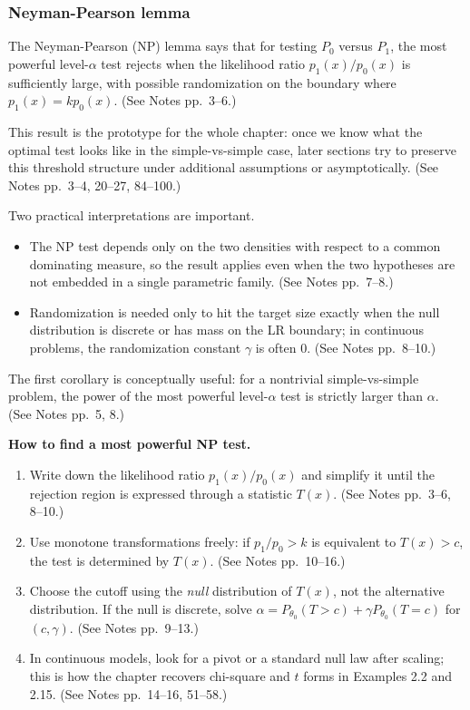 \subsubsection{Neyman-Pearson lemma}
The Neyman-Pearson (NP) lemma says that for testing $P_0$ versus $P_1$, the most powerful level-$\alpha$ test rejects when the likelihood ratio $p_1(x)/p_0(x)$ is sufficiently large, with possible randomization on the boundary where $p_1(x)=kp_0(x)$. (See Notes pp.~3--6.)

This result is the prototype for the whole chapter: once we know what the optimal test looks like in the simple-vs-simple case, later sections try to preserve this threshold structure under additional assumptions or asymptotically. (See Notes pp.~3--4, 20--27, 84--100.)

Two practical interpretations are important.
\begin{itemize}
    \item The NP test depends only on the two densities with respect to a common dominating measure, so the result applies even when the two hypotheses are not embedded in a single parametric family. (See Notes pp.~7--8.)
    \item Randomization is needed only to hit the target size exactly when the null distribution is discrete or has mass on the LR boundary; in continuous problems, the randomization constant $\gamma$ is often $0$. (See Notes pp.~8--10.)
\end{itemize}

The first corollary is conceptually useful: for a nontrivial simple-vs-simple problem, the power of the most powerful level-$\alpha$ test is strictly larger than $\alpha$. (See Notes pp.~5, 8.)

\begin{mybox}
\textbf{How to find a most powerful NP test.}
\begin{enumerate}
    \item Write down the likelihood ratio $p_1(x)/p_0(x)$ and simplify it until the rejection region is expressed through a statistic $T(x)$. (See Notes pp.~3--6, 8--10.)
    \item Use monotone transformations freely: if $p_1/p_0 > k$ is equivalent to $T(x) > c$, the test is determined by $T(x)$. (See Notes pp.~10--16.)
    \item Choose the cutoff using the \emph{null} distribution of $T(x)$, not the alternative distribution. If the null is discrete, solve $\alpha = P_{\theta_0}(T>c) + \gamma P_{\theta_0}(T=c)$ for $(c,\gamma)$. (See Notes pp.~9--13.)
    \item In continuous models, look for a pivot or a standard null law after scaling; this is how the chapter recovers chi-square and $t$ forms in Examples 2.2 and 2.15. (See Notes pp.~14--16, 51--58.)
\end{enumerate}
\end{mybox}

